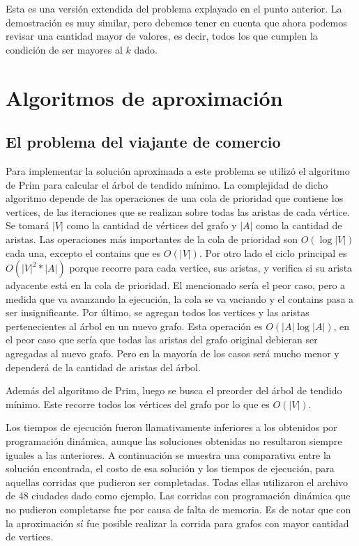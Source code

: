 \documentclass[a4paper,10pt]{article}
\begin{document}
Esta es una versión extendida del problema explayado en el punto anterior. La demostración es muy similar, pero debemos tener en cuenta que ahora podemos revisar una cantidad mayor de valores, es decir, todos los que cumplen la condición de ser mayores al \(k\) dado.

\section{Algoritmos de aproximación}

\subsection{El problema del viajante de comercio}

Para implementar la solución aproximada a este problema se utilizó el algoritmo de Prim para calcular el árbol de tendido mínimo. La complejidad de dicho algoritmo depende de las operaciones de una cola de prioridad que contiene los vertices, de las iteraciones que se realizan sobre todas las aristas de cada vértice. Se tomará $|V|$ como la cantidad de vértices del grafo y $|A|$ como la cantidad de aristas. 
Las operaciones más importantes de la cola de prioridad son $O(\log{|V|})$ cada una, excepto el contains que es $O(|V|)$.
Por otro lado el ciclo principal es $O(|V|^2 *|A|)$ porque recorre para cada vertice, sus aristas, y verifica si su arista adyacente está en la cola de prioridad. El mencionado sería el peor caso, pero a medida que va avanzando la ejecución, la cola se va vaciando y el contains pasa a ser insignificante. Por último, se agregan todos los vertices y las aristas pertenecientes al árbol en un nuevo grafo. Esta operación es $O(|A| \log{|A|})$, en el peor caso que sería que todas las aristas del grafo original debieran ser agregadas al nuevo grafo. Pero en la mayoría de los casos será mucho menor y dependerá de la cantidad de aristas del árbol.

Además del algoritmo de Prim, luego se busca el preorder del árbol de tendido mínimo. Este recorre todos los vértices del grafo por lo que es $O(|V|)$.

Los tiempos de ejecución fueron llamativamente inferiores a los obtenidos por programación dinámica, aunque las soluciones obtenidas no resultaron siempre iguales a las anteriores. A continuación se muestra una comparativa entre la solución encontrada, el costo de esa solución y los tiempos de ejecución, para aquellas corridas que pudieron ser completadas. Todas ellas utilizaron el archivo de 48 ciudades dado como ejemplo. Las corridas con programación dinámica que no pudieron completarse fue por causa de falta de memoria. Es de notar que con la aproximación sí fue posible realizar la corrida para grafos con mayor cantidad de vertices.
\end{document}
